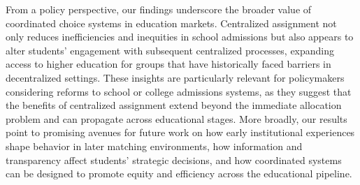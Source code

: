 From a policy perspective, our findings underscore the broader value of coordinated choice systems in education markets. Centralized assignment not only reduces inefficiencies and inequities in school admissions but also appears to alter students' engagement with subsequent centralized processes, expanding access to higher education for groups that have historically faced barriers in decentralized settings. These insights are particularly relevant for policymakers considering reforms to school or college admissions systems, as they suggest that the benefits of centralized assignment extend beyond the immediate allocation problem and can propagate across educational stages. More broadly, our results point to promising avenues for future work on how early institutional experiences shape behavior in later matching environments, how information and transparency affect students' strategic decisions, and how coordinated systems can be designed to promote equity and efficiency across the educational pipeline.


